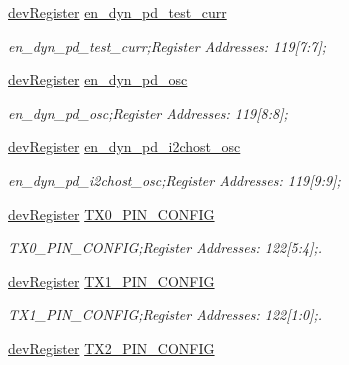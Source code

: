 \begin{DoxyCompactItemize}
\mbox{\hyperlink{classdev_register}{dev\+Register}} \mbox{\hyperlink{class_o_p_t3101_registers_a2840adf1406396e8aaad4b2b511263f4}{en\+\_\+dyn\+\_\+pd\+\_\+test\+\_\+curr}}
\begin{DoxyCompactList}\small\item\em en\+\_\+dyn\+\_\+pd\+\_\+test\+\_\+curr;Register Addresses\+: 119\mbox{[}7\+:7\mbox{]}; \end{DoxyCompactList}\item 
\mbox{\hyperlink{classdev_register}{dev\+Register}} \mbox{\hyperlink{class_o_p_t3101_registers_a84e49be726f4e0185d74574e0e5125e6}{en\+\_\+dyn\+\_\+pd\+\_\+osc}}
\begin{DoxyCompactList}\small\item\em en\+\_\+dyn\+\_\+pd\+\_\+osc;Register Addresses\+: 119\mbox{[}8\+:8\mbox{]}; \end{DoxyCompactList}\item 
\mbox{\hyperlink{classdev_register}{dev\+Register}} \mbox{\hyperlink{class_o_p_t3101_registers_aeff3363547a60ee9cd15683d2d928a98}{en\+\_\+dyn\+\_\+pd\+\_\+i2chost\+\_\+osc}}
\begin{DoxyCompactList}\small\item\em en\+\_\+dyn\+\_\+pd\+\_\+i2chost\+\_\+osc;Register Addresses\+: 119\mbox{[}9\+:9\mbox{]}; \end{DoxyCompactList}\item 
\mbox{\hyperlink{classdev_register}{dev\+Register}} \mbox{\hyperlink{class_o_p_t3101_registers_aeb14b14455b85035385487feaa6b8191}{T\+X0\+\_\+\+P\+I\+N\+\_\+\+C\+O\+N\+F\+IG}}
\begin{DoxyCompactList}\small\item\em T\+X0\+\_\+\+P\+I\+N\+\_\+\+C\+O\+N\+F\+IG;Register Addresses\+: 122\mbox{[}5\+:4\mbox{]};. \end{DoxyCompactList}\item 
\mbox{\hyperlink{classdev_register}{dev\+Register}} \mbox{\hyperlink{class_o_p_t3101_registers_a48f818c35d56f58188c835e1015dd8a1}{T\+X1\+\_\+\+P\+I\+N\+\_\+\+C\+O\+N\+F\+IG}}
\begin{DoxyCompactList}\small\item\em T\+X1\+\_\+\+P\+I\+N\+\_\+\+C\+O\+N\+F\+IG;Register Addresses\+: 122\mbox{[}1\+:0\mbox{]};. \end{DoxyCompactList}\item 
\mbox{\hyperlink{classdev_register}{dev\+Register}} \mbox{\hyperlink{class_o_p_t3101_registers_ad85c3690f3796209b20e40e7b41f7e79}{T\+X2\+\_\+\+P\+I\+N\+\_\+\+C\+O\+N\+F\+IG}}

\end{DoxyCompactItemize}
